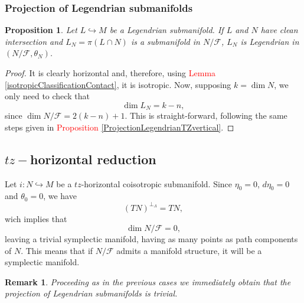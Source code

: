 \documentclass[12pt]{article}
\newtheorem{prop}{Proposition}[section]
\newtheorem{remark}{Remark}[section]
\renewcommand{\dim}{\operatorname{dim}}
\begin{document}
\subsubsection{Projection of Legendrian submanifolds}
\begin{prop}Let $L \hookrightarrow M$ be a Legendrian submanifold. If $L$ and $N$ have clean intersection and $L_N = \pi(L \cap N)$ is a submanifold in $N/\mathcal{F}$, $L_N$ is Legendrian in $(N/\mathcal{F}, \theta_N)$.
\end{prop}
\begin{proof} It is clearly horizontal and, therefore, using \textcolor{red}{Lemma \ref{isotropicClassificationContact}}, it is isotropic. Now, supposing $k = \dim N$, we only need to check that $$\dim L_N = k - n,$$ since $\dim N/\mathcal{F} = 2(k - n) + 1.$ This is straight-forward, following the same steps given in  \textcolor{red}{Proposition \ref{ProjectionLegendrianTZvertical}}.
\end{proof}

\subsection{\texorpdfstring{$tz-$}-horizontal reduction}
Let $i: N \hookrightarrow M$ be a $tz$-horizontal coisotropic submanifold. Since $\eta_0 = 0$, $d\eta_0 = 0$ and $\theta_0 = 0$, we have $$(TN)^{\perp_\Lambda} = TN,$$ wich implies that $$\dim N/\mathcal{F} = 0,$$ leaving a trivial symplectic manifold, having as many points as path components of $N$. This means that if $N/\mathcal{F}$ admits a manifold structure, it will be a symplectic manifold. \\

\begin{remark}{\rm Proceeding as in the previous cases we immediately obtain that the projection of Legendrian submanifolds is trivial.}
\end{remark}


\end{document}
